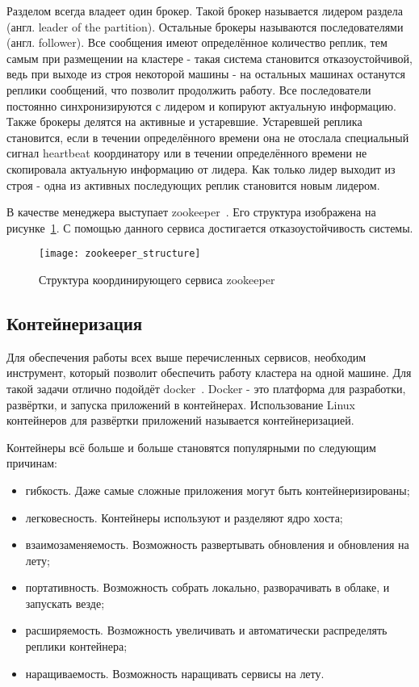 Разделом всегда владеет один брокер.
Такой брокер называется лидером раздела (англ. leader of the partition).
Остальные брокеры называются последователями (англ. follower).
Все сообщения имеют определённое количество реплик, тем самым при размещении на кластере - такая система становится отказоустойчивой, ведь при выходе из строя некоторой машины - на остальных машинах останутся реплики сообщений, что позволит продолжить работу.
Все последователи постоянно синхронизируются с лидером и копируют актуальную информацию.
Также брокеры делятся на активные и устаревшие.
Устаревшей реплика становится, если в течении определённого времени она не отослала специальный сигнал heartbeat координатору или в течении определённого времени не скопировала актуальную информацию от лидера.
Как только лидер выходит из строя - одна из активных последующих реплик становится новым лидером.

В качестве менеджера выступает zookeeper~\cite{zookeeper_documentation_intro}.
Его структура изображена на рисунке~\ref{pic:lit_review:zookeeper_structure}.                   
С помощью данного сервиса достигается отказоустойчивость системы.

\begin{figure}
    \centering
    \texttt{[image: zookeeper\_structure]}
    \caption{Структура координирующего сервиса zookeeper}
    \label{pic:lit_review:zookeeper_structure}
\end{figure}

\subsection{Контейнеризация}

Для обеспечения работы всех выше перечисленных сервисов, необходим инструмент, который позволит обеспечить работу кластера на одной машине.
Для такой задачи отлично подойдёт docker~\cite{docker_documentation_intro}.
Docker - это платформа для разработки, развёртки, и запуска приложений в контейнерах.
Использование Linux контейнеров для развёртки приложений называется контейнеризацией.

Контейнеры всё больше и больше становятся популярными по следующим причинам:
\begin{itemize}
    \item гибкость. Даже самые сложные приложения могут быть контейнеризированы;
    \item легковесность. Контейнеры используют и разделяют ядро хоста;
    \item взаимозаменяемость. Возможность развертывать обновления и обновления на лету;
    \item портативность. Возможность собрать локально, разворачивать в облаке, и запускать везде;
    \item расширяемость. Возможность увеличивать и автоматически распределять реплики контейнера;
    \item наращиваемость. Возможность наращивать сервисы на лету.
\end{itemize}

